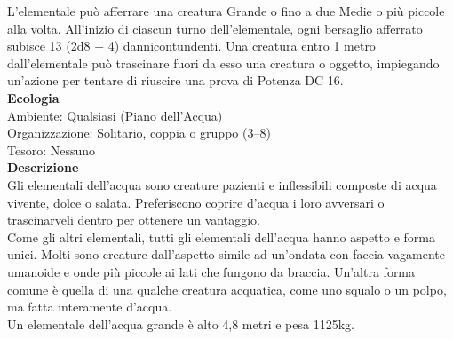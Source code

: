 \begin{multicols}{2}
L'elementale può afferrare una creatura Grande o fino a due Medie o più piccole alla volta. All'inizio di ciascun turno dell'elementale, ogni bersaglio afferrato subisce 13 (2d8 + 4) dannicontundenti. Una creatura entro 1 metro dall'elementale può trascinare fuori da esso una  creatura o oggetto, impiegando un'azione per tentare di riuscire una prova di Potenza DC  16.\\
\textbf{Ecologia}\\
Ambiente: Qualsiasi (Piano dell'Acqua)\\
Organizzazione: Solitario, coppia o gruppo (3–8)\\
Tesoro: Nessuno\\
\textbf{Descrizione}\\
Gli elementali dell'acqua sono creature pazienti e inflessibili composte di acqua vivente, dolce o salata. Preferiscono coprire d’acqua i loro avversari o trascinarveli dentro per ottenere un vantaggio.\\
Come gli altri elementali, tutti gli elementali dell'acqua hanno aspetto e forma unici. Molti sono creature dall'aspetto simile ad un’ondata con faccia vagamente umanoide e onde più piccole ai lati che fungono da braccia. Un’altra forma comune è quella di una qualche creatura acquatica, come uno squalo o un polpo, ma fatta interamente d'acqua.\\
Un elementale dell'acqua grande è alto 4,8 metri e pesa 1125kg.\\


\end{multicols}
